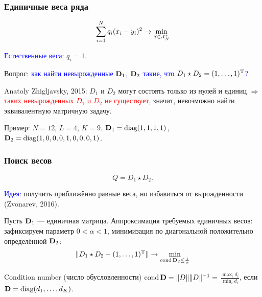 \documentclass[unicode, notheorems]{beamer}
\DeclareMathOperator{\cond}{cond}
\begin{document}
\begin{frame}
	\frametitle{Единичные веса ряда}
	\vspace{-0.3cm}
	\begin{equation*}
	\sum \limits_{i=1}^N q_i(x_i - y_i)^2 \to \min_{\mathbb{Y} \in \mathcal{X}_N^r}
	\end{equation*}
	
    \textcolor{blue}{Естественные веса:} $q_i = 1$.
	
	\vspace{0.3cm}
	
	Вопрос: \textcolor{blue}{как найти невырожденные $\mathbf{D}_1$, $\mathbf{D}_2$ такие, что $D_1 \star D_2 = (1, \ldots, 1)^{\mathrm{T}}$?}
	
	Anatoly Zhigljavsky, 2015: $D_1$ и $D_2$ могут состоять только из нулей и единиц $\Rightarrow$ \textcolor{red}{таких невырожденных $D_1$ и $D_2$ не существует,} значит, невозможно найти эквивалентную матричную задачу.
	
	\vspace{0.4cm}
	Пример: $N = 12$, $L = 4$, $K = 9$. $\mathbf{D}_1 = \text{diag}(1, 1, 1, 1)$, 
	$\mathbf{D}_2 = \text{diag}(1, 0, 0, 0, 1, 0, 0, 0, 1)$.
\end{frame}

\begin{frame}
	\frametitle{Поиск весов}
	\begin{equation*}
	Q = D_1 \star D_2.
	\end{equation*}
	
	\textcolor{blue}{Идея:} получить приближённо равные веса, но избавиться от вырожденности (Zvonarev, 2016). 
	
	Пусть $\mathbf{D}_1$ --- единичная матрица. Аппроксимация требуемых единичных весов: зафиксируем параметр $0 < \alpha < 1$, минимизация по диагональной положительно определённой $\mathbf{D}_2$:
	\begin{equation*}
	\|D_1 \star D_2 - (1, \ldots, 1)^\rmT\| \to \min_{\cond \bfD_2 \le \frac{1}{\alpha}}
	\end{equation*}
	
	\vspace{0.2cm}
	Condition number (число обусловленности) $\cond \bfD = \|D\| \|D\|^{-1} = $ $\frac{\max_i d_i}{\min_i d_i}$, если $\mathbf{D} = \text{diag}(d_1, \ldots, d_K)$.
\end{frame}
\end{document}
